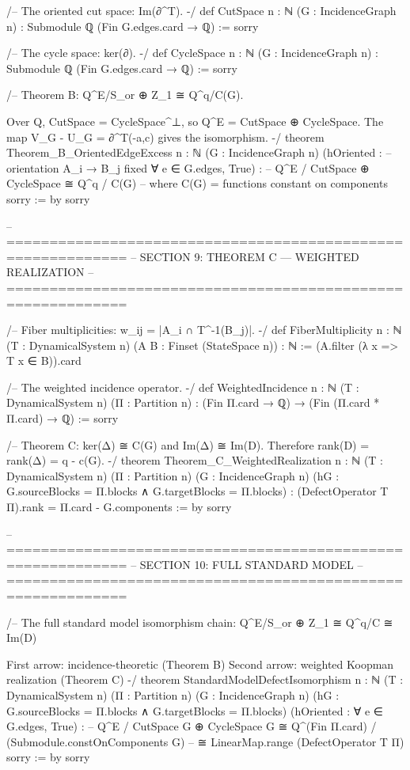/-- The oriented cut space: Im(∂^T). -/
def CutSpace {n : ℕ} (G : IncidenceGraph n) : Submodule ℚ (Fin G.edges.card → ℚ) :=
  sorry

/-- The cycle space: ker(∂). -/
def CycleSpace {n : ℕ} (G : IncidenceGraph n) : Submodule ℚ (Fin G.edges.card → ℚ) :=
  sorry

/-- Theorem B: Q^E/S_or ⊕ Z_1 ≅ Q^q/C(G).

    Over Q, CutSpace = CycleSpace^⊥, so Q^E = CutSpace ⊕ CycleSpace.
    The map V_G - U_G = ∂^T(-a,c) gives the isomorphism.
-/
theorem Theorem_B_OrientedEdgeExcess {n : ℕ} (G : IncidenceGraph n)
    (hOriented : -- orientation A_i → B_j fixed
      ∀ e ∈ G.edges, True) :
    -- Q^E / CutSpace ⊕ CycleSpace ≅ Q^q / C(G)
    -- where C(G) = functions constant on components
    sorry := by
  sorry

-- ============================================================
-- SECTION 9: THEOREM C — WEIGHTED REALIZATION
-- ============================================================

/-- Fiber multiplicities: w_{ij} = |A_i ∩ T^{-1}(B_j)|. -/
def FiberMultiplicity {n : ℕ} (T : DynamicalSystem n) (A B : Finset (StateSpace n)) : ℕ :=
  (A.filter (λ x => T x ∈ B)).card

/-- The weighted incidence operator. -/
def WeightedIncidence {n : ℕ} (T : DynamicalSystem n) (Π : Partition n) :
    (Fin Π.card → ℚ) → (Fin (Π.card * Π.card) → ℚ) :=
  sorry

/-- Theorem C: ker(Δ) ≅ C(G) and Im(Δ) ≅ Im(D).
    Therefore rank(D) = rank(Δ) = q - c(G). -/
theorem Theorem_C_WeightedRealization {n : ℕ} (T : DynamicalSystem n) (Π : Partition n)
    (G : IncidenceGraph n) (hG : G.sourceBlocks = Π.blocks ∧ G.targetBlocks = Π.blocks) :
    (DefectOperator T Π).rank = Π.card - G.components := by
  sorry

-- ============================================================
-- SECTION 10: FULL STANDARD MODEL
-- ============================================================

/-- The full standard model isomorphism chain:
    Q^E/S_or ⊕ Z_1 ≅ Q^q/C ≅ Im(D)

    First arrow: incidence-theoretic (Theorem B)
    Second arrow: weighted Koopman realization (Theorem C)
-/
theorem StandardModelDefectIsomorphism {n : ℕ} (T : DynamicalSystem n) (Π : Partition n)
    (G : IncidenceGraph n) (hG : G.sourceBlocks = Π.blocks ∧ G.targetBlocks = Π.blocks)
    (hOriented : ∀ e ∈ G.edges, True) :
    -- Q^E / CutSpace G ⊕ CycleSpace G ≅ Q^(Fin Π.card) / (Submodule.constOnComponents G)
    -- ≅ LinearMap.range (DefectOperator T Π)
    sorry := by
  sorry

